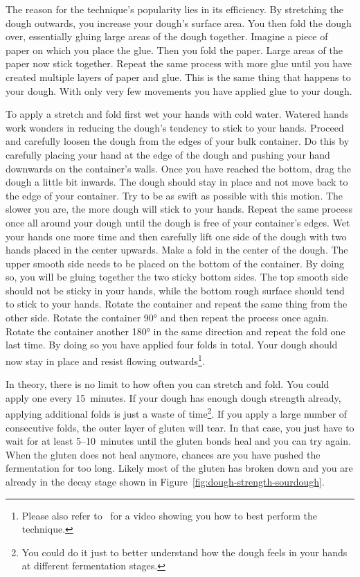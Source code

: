 The reason for the technique's popularity lies in its efficiency. By stretching
the dough outwards, you increase your dough's surface area. You then fold the
dough over, essentially gluing large areas of the dough together. Imagine a
piece of paper on which you place the glue. Then you fold the paper. Large areas
of the paper now stick together. Repeat the same process with more glue until
you have created multiple layers of paper and glue. This is the same thing that
happens to your dough. With only very few movements you have applied glue to your
dough.

To apply a stretch and fold first wet your hands with cold water. Watered hands
work wonders in reducing the dough's tendency to stick to your hands. Proceed and
carefully loosen the dough from the edges of your bulk container. Do this by
carefully placing your hand at the edge of the dough and pushing your hand
downwards on the container's walls. Once you have reached the bottom, drag the dough
a little bit inwards. The dough should stay in place and not move back to the
edge of your container. Try to be as swift as possible with this motion. The
slower you are, the more dough will stick to your hands. Repeat the same process
once all around your dough until the dough is free of your container's edges.
Wet your hands one more time and then carefully lift one side of the dough with
two hands placed in the center upwards. Make a fold in the center of the dough.
The upper smooth side needs to be placed on the bottom of the container. By doing
so, you will be gluing together the two sticky bottom sides. The top smooth
side should not be sticky in your hands, while the bottom rough surface should
tend to stick to your hands. Rotate the container and repeat the same thing
from the other side. Rotate the container \ang{90} and then repeat the process
once again. Rotate the container another \ang{180} in the same direction and
repeat the fold one last time. By doing so you have applied four folds in
total. Your dough should now stay in place and resist flowing
outwards\footnote{Please also refer to~\cite{stretch+and+fold+technique} for a
video showing you how to best perform the technique.}.

In theory, there is no limit to how often you can stretch and fold. You could
apply one every 15~minutes. If your dough has enough dough strength already,
applying additional folds is just a waste of time\footnote{You could do it
just to better understand how the dough feels in your hands at different
fermentation stages.}. If you apply a large number of consecutive folds, the
outer layer of gluten
will tear. In that case, you just have to wait for at least 5--10~minutes until
the gluten bonds heal and you can try again. When the gluten does not heal
anymore, chances are you have pushed the fermentation for too long. Likely
most of the gluten has broken down and you are already
in the decay stage shown in Figure~\ref{fig:dough-strength-sourdough}.

